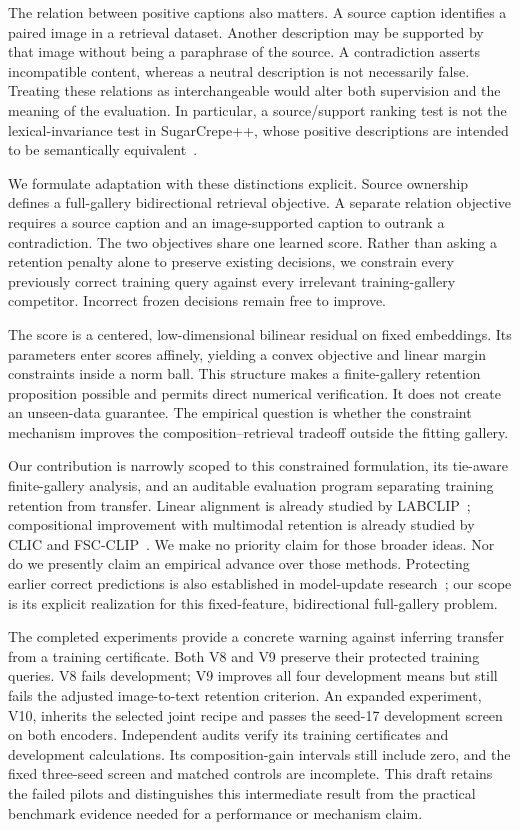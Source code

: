 \documentclass[11pt]{article}
\begin{document}
The relation between positive captions also matters. A source caption
identifies a paired image in a retrieval dataset. Another description may
be supported by that image without being a paraphrase of the source. A
contradiction asserts incompatible content, whereas a neutral description
is not necessarily false. Treating these relations as interchangeable
would alter both supervision and the meaning of the evaluation. In
particular, a source/support ranking test is not the lexical-invariance
test in SugarCrepe++, whose positive descriptions are intended to be
semantically equivalent~\cite{sugarcrepepp}.

We formulate adaptation with these distinctions explicit. Source ownership
defines a full-gallery bidirectional retrieval objective. A separate
relation objective requires a source caption and an image-supported
caption to outrank a contradiction. The two objectives share one learned
score. Rather than asking a retention penalty alone to preserve existing
decisions, we constrain every previously correct training query against
every irrelevant training-gallery competitor. Incorrect frozen decisions
remain free to improve.

The score is a centered, low-dimensional bilinear residual on fixed
embeddings. Its parameters enter scores affinely, yielding a convex
objective and linear margin constraints inside a norm ball. This structure
makes a finite-gallery retention proposition possible and permits direct
numerical verification. It does not create an unseen-data guarantee.
The empirical question is whether the constraint mechanism improves the
composition--retrieval tradeoff outside the fitting gallery.

Our contribution is narrowly scoped to this constrained formulation, its
tie-aware finite-gallery analysis, and an auditable evaluation program
separating training retention from transfer. Linear alignment is already
studied by LABCLIP~\cite{labclip}; compositional improvement with multimodal
retention is already studied by CLIC and FSC-CLIP~\cite{clic,fsc}.
We make no priority claim for those broader ideas. Nor do we presently
claim an empirical advance over those methods.
Protecting earlier correct predictions is also established in model-update
research~\cite{pct,rcat}; our scope is its explicit realization for this
fixed-feature, bidirectional full-gallery problem.

The completed experiments provide a concrete warning against inferring
transfer from a training certificate. Both V8 and V9 preserve their
protected training queries. V8 fails development; V9 improves all four
development means but still fails the adjusted image-to-text retention
criterion. An expanded experiment, V10, inherits the selected joint recipe
and passes the seed-17 development screen on both encoders. Independent
audits verify its training certificates and development calculations.
Its composition-gain intervals still include zero, and the fixed three-seed
screen and matched controls are incomplete. This draft retains the failed
pilots and distinguishes this intermediate result from the practical
benchmark evidence needed for a performance or mechanism claim.
\end{document}
